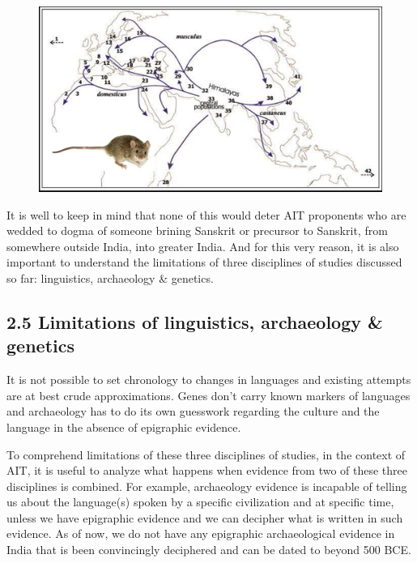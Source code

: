 \begin{figure}[!htbp]
\includegraphics[scale=0.22]{images/8-11.jpg}
\caption{}\label{art8-fig11}
\end{figure}

\newpage

It is well to keep in mind that none of this would deter AIT proponents who are wedded to dogma of someone brining Sanskrit or precursor to Sanskrit, from somewhere outside India, into greater India. And for this very reason, it is also important to understand the limitations of three disciplines of studies discussed so far: linguistics, archaeology \& genetics.


\subsection*{2.5 Limitations of linguistics, archaeology \& genetics}

It is not possible to set chronology to changes in languages and existing attempts are at best crude approximations. Genes don’t carry known markers of languages and archaeology has to do its own guesswork regarding the culture and the language in the absence of epigraphic evidence.

To comprehend limitations of these three disciplines of studies, in the context of AIT, it is useful to analyze what happens when evidence from two of these three disciplines is combined. For example, archaeology evidence is incapable of telling us about the language(s) spoken by a specific civilization and at specific time, unless we have epigraphic evidence and we can decipher what is written in such evidence. As of now, we do not have any epigraphic archaeological evidence in India that is been convincingly deciphered and can be dated to beyond 500 BCE.

